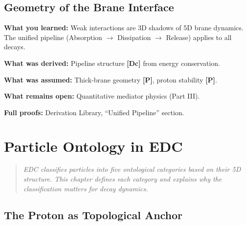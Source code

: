 \documentclass[11pt,a4paper]{book}
\theoremstyle{definition}
\theoremstyle{remark}
\newcommand{\tagDc}{\textcolor{calibratedColor}{\textbf{[Dc]}}}
\newcommand{\tagP}{\textcolor{postulatedColor}{\textbf{[P]}}}
\begin{document}


\section{Geometry of the Brane Interface}



\begin{chapterRecap}
\textbf{What you learned:} Weak interactions are 3D shadows of 5D brane dynamics.
The unified pipeline (Absorption $\to$ Dissipation $\to$ Release) applies to all decays.

\textbf{What was derived:} Pipeline structure \tagDc{} from energy conservation.

\textbf{What was assumed:} Thick-brane geometry \tagP{}, proton stability \tagP{}.

\textbf{What remains open:} Quantitative mediator physics (Part III).

\textbf{Full proofs:} Derivation Library, ``Unified Pipeline'' section.
\end{chapterRecap}

\chapter{Particle Ontology in EDC}
\label{ch:ontology}

\begin{quote}
\textit{EDC classifies particles into five ontological categories based on their
5D structure. This chapter defines each category and explains why the classification
matters for decay dynamics.}
\end{quote}



\section{The Proton as Topological Anchor}


\end{document}
